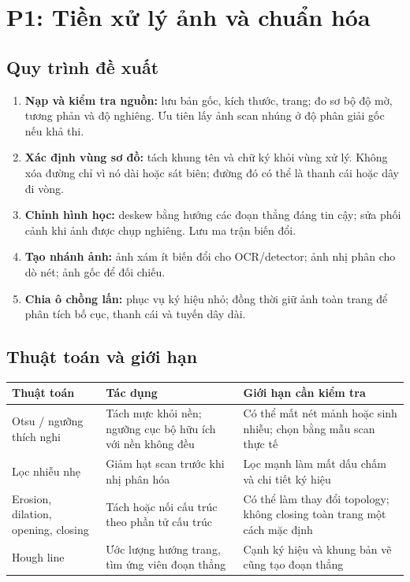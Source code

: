 \documentclass[11pt,a4paper]{article}
\begin{document}
\clearpage
\section{P1: Tiền xử lý ảnh và chuẩn hóa}
\subsection{Quy trình đề xuất}
\begin{enumerate}
\item \textbf{Nạp và kiểm tra nguồn:} lưu bản gốc, kích thước, trang; đo sơ bộ độ mờ, tương phản và độ nghiêng. Ưu tiên lấy ảnh scan nhúng ở độ phân giải gốc nếu khả thi.
\item \textbf{Xác định vùng sơ đồ:} tách khung tên và chữ ký khỏi vùng xử lý. Không xóa đường chỉ vì nó dài hoặc sát biên; đường đó có thể là thanh cái hoặc dây đi vòng.
\item \textbf{Chỉnh hình học:} deskew bằng hướng các đoạn thẳng đáng tin cậy; sửa phối cảnh khi ảnh được chụp nghiêng. Lưu ma trận biến đổi.
\item \textbf{Tạo nhánh ảnh:} ảnh xám ít biến đổi cho OCR/detector; ảnh nhị phân cho dò nét; ảnh gốc để đối chiếu.
\item \textbf{Chia ô chồng lấn:} phục vụ ký hiệu nhỏ; đồng thời giữ ảnh toàn trang để phân tích bố cục, thanh cái và tuyến dây dài.
\end{enumerate}

\subsection{Thuật toán và giới hạn}
\begin{tabularx}{\linewidth}{@{}>{\raggedright\arraybackslash}p{36mm}Y Y@{}}
\toprule
\textbf{Thuật toán} & \textbf{Tác dụng} & \textbf{Giới hạn cần kiểm tra}\\\midrule
Otsu / ngưỡng thích nghi & Tách mực khỏi nền; ngưỡng cục bộ hữu ích với nền không đều & Có thể mất nét mảnh hoặc sinh nhiễu; chọn bằng mẫu scan thực tế\\
Lọc nhiễu nhẹ & Giảm hạt scan trước khi nhị phân hóa & Lọc mạnh làm mất dấu chấm và chi tiết ký hiệu\\
Erosion, dilation, opening, closing & Tách hoặc nối cấu trúc theo phần tử cấu trúc \cite{morph} & Có thể làm thay đổi topology; không closing toàn trang một cách mặc định\\
Hough line & Ước lượng hướng trang, tìm ứng viên đoạn thẳng \cite{hough} & Cạnh ký hiệu và khung bản vẽ cũng tạo đoạn thẳng\\\bottomrule
\end{tabularx}
\end{document}
